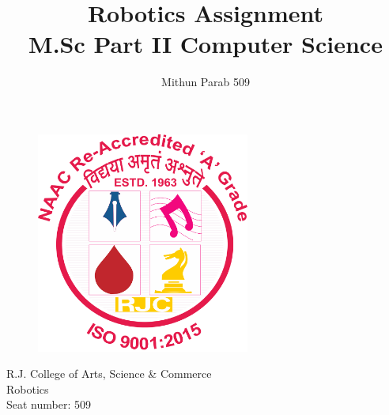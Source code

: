\documentclass{article}
\title{\huge{\textbf{ Robotics Assignment}} \\
\LARGE{M.Sc Part II Computer Science}}
\author{Mithun Parab 509}
\makeatletter
\def@{\color{orange}\svat\atend}
\makeatother
\begin{document}
\clearpage\maketitle
\thispagestyle{empty}
\begin{center}
    \begin{figure}[h]
        \centering
        \includegraphics[width=7cm]{images/RJCLG.png}
        \label{fig:logo}
    \end{figure}

    \large{R.J. College of Arts, Science \& Commerce \\
    Robotics\\
    Seat number: 509
    }
\end{center}
\newpage
% 


\newpage
\tableofcontents
\listoffigures
\newpage
{} %



    
\newpage

\end{document}
